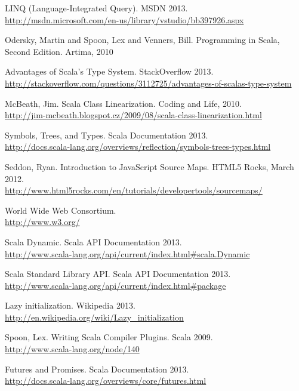 \begin{thebibliography}{99}
  LINQ (Language-Integrated Query). MSDN 2013.\\
  \url{http://msdn.microsoft.com/en-us/library/vstudio/bb397926.aspx}
	
	{\sc Odersky,} Martin and {\sc Spoon,} Lex and {\sc Venners,} Bill.  Programming in Scala, Second Edition. Artima, 2010
	
	Advantages of Scala's Type System. StackOverflow 2013.\\
	\url{http://stackoverflow.com/questions/3112725/advantages-of-scalas-type-system}
	
  {\sc McBeath}, Jim. Scala Class Linearization. Coding and Life, 2010.\\
	\url{http://jim-mcbeath.blogspot.cz/2009/08/scala-class-linearization.html}
	
	Symbols, Trees, and Types. Scala Documentation 2013.\\
	\url{http://docs.scala-lang.org/overviews/reflection/symbols-trees-types.html}
	
  {\sc Seddon,} Ryan. Introduction to JavaScript Source Maps. HTML5 Rocks, March 2012.\\
  \url{http://www.html5rocks.com/en/tutorials/developertools/sourcemaps/}
	
  World Wide Web Consortium.\\
	\url{http://www.w3.org/}
	
  Scala Dynamic. Scala API Documentation 2013.\\
	\url{http://www.scala-lang.org/api/current/index.html\#scala.Dynamic}
	
	Scala Standard Library API. Scala API Documentation 2013.\\
  \url{http://www.scala-lang.org/api/current/index.html\#package}
	
  Lazy initialization. Wikipedia 2013.\\
	\url{http://en.wikipedia.org/wiki/Lazy\_initialization}
	
  {\sc Spoon,} Lex. Writing Scala Compiler Plugins. Scala 2009.\\
  \url{http://www.scala-lang.org/node/140}
	
  Futures and Promises. Scala Documentation 2013.\\
  \url{http://docs.scala-lang.org/overviews/core/futures.html}
	

\end{thebibliography}
